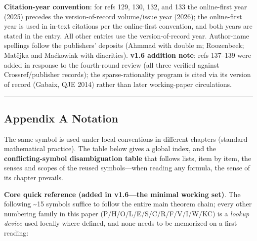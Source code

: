 \documentclass[
  11pt]{article}
\begin{document}
\textbf{Citation-year convention}: for refs 129, 130, 132, and 133 the
online-first year (2025) precedes the version-of-record volume/issue
year (2026); the online-first year is used in in-text citations per the
online-first convention, and both years are stated in the entry. All
other entries use the version-of-record year. Author-name spellings
follow the publishers' deposits (Ahmmad with double m; Roozenbeek;
Matějka and Maćkowiak with diacritics). \textbf{v1.6 addition note}:
refs 137--139 were added in response to the fourth-round review (all
three verified against Crossref/publisher records); the
sparse-rationality program is cited via its version of record (Gabaix,
QJE 2014) rather than later working-paper circulations.

\begin{center}\rule{0.5\linewidth}{0.5pt}\end{center}

\subsection{Appendix A Notation}\label{appendix-a-notation}

The same symbol is used under local conventions in different chapters
(standard mathematical practice). The table below gives a global index,
and the \textbf{conflicting-symbol disambiguation table} that follows
lists, item by item, the senses and scopes of the reused symbols---when
reading any formula, the sense of its chapter prevails.

\textbf{Core quick reference (added in v1.6---the minimal working set)}.
The following \textasciitilde15 symbols suffice to follow the entire
main theorem chain; every other numbering family in this paper
(P/H/O/L/E/S/C/R/F/V/I/W/KC) is a \emph{lookup device} used locally
where defined, and none needs to be memorized on a first reading:
\end{document}
